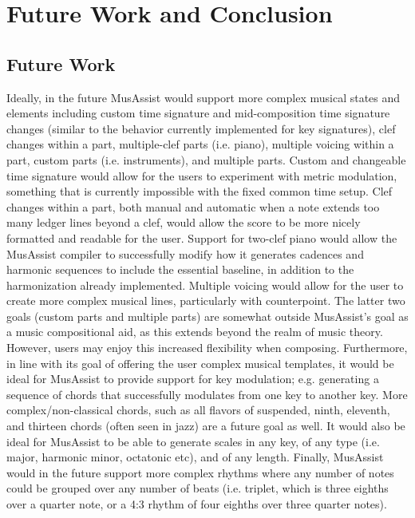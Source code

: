 \documentclass{report}
\begin{document}
\chapter{Future Work and Conclusion}
\section{Future Work}
Ideally, in the future MusAssist would support more complex musical states and elements including custom time signature and mid-composition time signature changes (similar to the behavior currently implemented for key signatures), clef changes within a part, multiple-clef parts (i.e. piano), multiple voicing within a part, custom parts (i.e. instruments), and multiple parts. Custom and changeable time signature would allow for the users to experiment with metric modulation, something that is currently impossible with the fixed common time setup. Clef changes within a part, both manual and automatic when a note extends too many ledger lines beyond a clef, would allow the score to be more nicely formatted and readable for the user. Support for two-clef piano would allow the MusAssist compiler to successfully modify how it generates cadences and harmonic sequences to include the essential baseline, in addition to the harmonization already implemented. Multiple voicing would allow for the user to create more complex musical lines, particularly with counterpoint. The latter two goals (custom parts and multiple parts) are somewhat outside MusAssist's goal as a music compositional aid, as this extends beyond the realm of music theory. However, users may enjoy this increased flexibility when composing. Furthermore, in line with its goal of offering the user complex musical templates, it would be ideal for MusAssist to provide support for key modulation; e.g. generating a sequence of chords that successfully modulates from one key to another key. More complex/non-classical chords, such as all flavors of suspended, ninth, eleventh, and thirteen chords (often seen in jazz) are a future goal as well. It would also be ideal for MusAssist to be able to generate scales in any key, of any type (i.e. major, harmonic minor, octatonic etc), and of any length. Finally, MusAssist would in the future support more complex rhythms where any number of notes could be grouped over any number of beats (i.e. triplet, which is three eighths over a quarter note, or a 4:3 rhythm of four eighths over three quarter notes).
\end{document}
